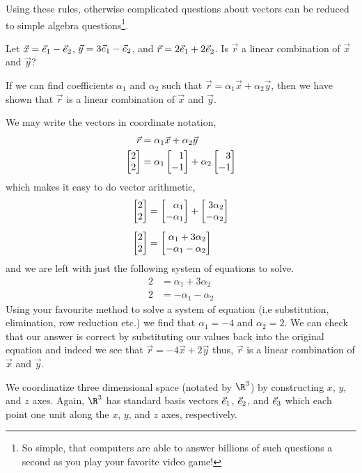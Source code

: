 Using these rules, otherwise complicated questions about vectors can be reduced
to simple algebra questions\footnote{ So simple, that computers are able to answer billions of
such questions a second as you play your favorite video game!}.

\begin{example}
	Let $\vec x={\vec e_1}-{\vec e_2}$, $\vec y=3{\vec e_1}-{\vec e_2}$, and $\vec r=2{\vec e_1}+2{\vec e_2}$. Is
	$\vec r$ a linear combination of $\vec x$ and $\vec y$?

	If we can find coefficients $\alpha_{1}$ and $\alpha_{2}$ such that 
	$\vec r = \alpha_{1}\vec x + \alpha_{2}\vec y$, then we have shown that 
	$\vec r$ is a linear combination of $\vec x$ and $\vec y$.
	
	We may write the vectors in coordinate notation,
	\begin{align*}
	\vec r &= \alpha_{1}\vec x + \alpha_{2}\vec y \\
	\mat{2\\2} &= \alpha_{1}\mat{1\\-1} + \alpha_{2}\mat{3\\-1}
	\end{align*}
	which makes it easy to do vector arithmetic,
	\begin{align*}
	\mat{2\\2} &= \mat{\alpha_{1}\\-\alpha_{1}} + \mat{3\alpha_{2}\\-\alpha_{2}} \\[0.5em]
	\mat{2\\2} &= \mat{\alpha_{1}+3\alpha_{2}\\-\alpha_{1}-\alpha_{2}}
	\end{align*}
	and we are left with just the following system of equations to solve.
	\begin{align*}
	2 &= \alpha_{1}+3\alpha_{2} \\
	2 &= -\alpha_{1}-\alpha_{2}
	\end{align*}
	Using your favourite method to solve a system of equation 
	(i.e substitution, elimination, row reduction etc.) 
	we find that $\alpha_{1}=-4$ and $\alpha_{2}=2$.
	We can check that our answer is correct by substituting our values back into the original equation 
	and indeed we see that $\vec r = -4\vec x + 2\vec y$ thus, 
	$\vec r$ is a linear combination of $\vec x$ and $\vec y$.
	
\end{example}

We coordinatize three dimensional space (notated by $\R^3$) by constructing $x$, $y$, and $z$ axes.
Again, $\R^3$ has standard basis vectors ${\vec e_1}$, ${\vec e_2}$, and ${\vec e_3}$ which each
point one unit along the $x$, $y$, and $z$ axes, respectively.


